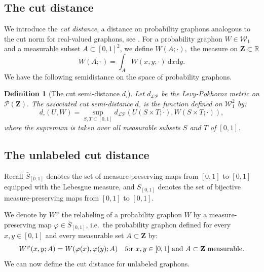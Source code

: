 \documentclass[11pt]{article}
\newtheorem{definition}[theorem]{Definition}
\def\R{\mathbb{R}}
\newcommand{\Space}{\mathbf{Z}}
\newcommand{\Graphon}{\mathcal{W}_1}
\newcommand{\InvRelabel}{S_{[0,1]}}
\newcommand{\Relabel}{\bar{S}_{[0,1]}}
\newcommand{\drv}{\mathrm{d}}
\begin{document}
\subsection{The cut distance}\label{section_def_dcut}
We introduce the \emph{cut  distance}, a distance on probability graphons analogous to the  cut norm for real-valued graphons, see  \cite[Chapter 8]{LovaszGraphLimits}.
For a probability graphon $W\in\Graphon$ and a measurable subset $A\subset [0,1]^2$,
we define $W(A;\cdot),$ the measure on $\Space\subset\R$
\[
  W(A;\cdot) = \int_{A} W(x,y;\cdot)\ \drv x \drv y.
\]
We have the following semidistance on the space of probability graphons.

\begin{definition}[The cut semi-distance $d_{\square}$]
Let $d_{\mathcal{LP}}$ be the Levy-Pokhorov metric on $\mathcal{P}(\mathbf{Z}).$  %
The associated cut semi-distance $d_{\square}$ is the function defined on $\Graphon^2$ by:
\begin{equation}\label{cutsemi-disteq}
    d_{\square}(U, W)=\sup _{S, T \subset[0,1]} d_{\mathcal{LP}}(U(S \times T ; \cdot), W(S \times T ; \cdot)),
\end{equation}
where the supremum is taken over all measurable subsets $S$ and $T$ of $[0,1]$.
\end{definition}

\subsection{The unlabeled  cut distance}
	\label{subsection_unlabeled_cut_distance}
Recall $\Relabel$ denotes the set of measure-preserving maps from $[0, 1]$ to $[0, 1]$ equipped with the Lebesgue measure, and $\InvRelabel$ denotes the set of bijective measure-preserving maps from $[0, 1]$ to $[0, 1]$.

We denote by $W^\varphi$ the relabeling of a probability graphon $W$ by a measure-preserving map $\varphi\in \Relabel$, i.e.\
the probability graphon defined for every $x,y\in [0,1]$ and every measurable set $A\subset \Space$ by:
\[
  W^\varphi(x,y;A) = W(\varphi(x),\varphi(y);A)
  \quad \text{for $x,y\in [0,1]$ and $ A\subset \Space$ measurable}.
\]
We can now define the cut distance for unlabeled graphons.
\end{document}
